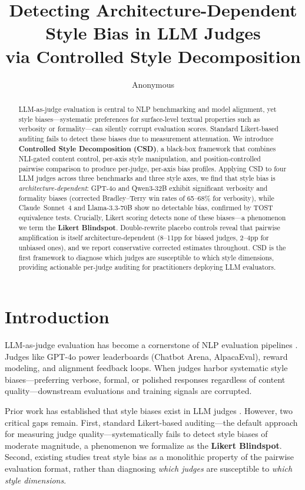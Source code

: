 \documentclass[11pt]{article}
\title{Detecting Architecture-Dependent Style Bias in LLM Judges\\via Controlled Style Decomposition}
\author{Anonymous}
\begin{document}
\maketitle

\begin{abstract}
LLM-as-judge evaluation is central to NLP benchmarking and model alignment, yet style biases---systematic preferences for surface-level textual properties such as verbosity or formality---can silently corrupt evaluation scores. Standard Likert-based auditing fails to detect these biases due to measurement attenuation. We introduce \textbf{Controlled Style Decomposition (CSD)}, a black-box framework that combines NLI-gated content control, per-axis style manipulation, and position-controlled pairwise comparison to produce per-judge, per-axis bias profiles. Applying CSD to four LLM judges across three benchmarks and three style axes, we find that style bias is \emph{architecture-dependent}: GPT-4o and Qwen3-32B exhibit significant verbosity and formality biases (corrected Bradley--Terry win rates of 65--68\% for verbosity), while Claude~Sonnet~4 and Llama-3.3-70B show no detectable bias, confirmed by TOST equivalence tests. Crucially, Likert scoring detects none of these biases---a phenomenon we term the \textbf{Likert Blindspot}. Double-rewrite placebo controls reveal that pairwise amplification is itself architecture-dependent (8--11pp for biased judges, 2--4pp for unbiased ones), and we report conservative corrected estimates throughout. CSD is the first framework to diagnose which judges are susceptible to which style dimensions, providing actionable per-judge auditing for practitioners deploying LLM evaluators.
\end{abstract}

\section{Introduction}

LLM-as-judge evaluation has become a cornerstone of NLP evaluation pipelines \cite{zheng2024judging,dubois2024alpacafarm}. Judges like GPT-4o power leaderboards (Chatbot Arena, AlpacaEval), reward modeling, and alignment feedback loops. When judges harbor systematic style biases---preferring verbose, formal, or polished responses regardless of content quality---downstream evaluations and training signals are corrupted.

Prior work has established that style biases exist in LLM judges \cite{wu2024style,park2024offsetbias,stureborg2024large}. However, two critical gaps remain. First, standard Likert-based auditing---the default approach for measuring judge quality---systematically fails to detect style biases of moderate magnitude, a phenomenon we formalize as the \textbf{Likert Blindspot}. Second, existing studies treat style bias as a monolithic property of the pairwise evaluation format, rather than diagnosing \emph{which judges} are susceptible to \emph{which style dimensions}.
\end{document}
